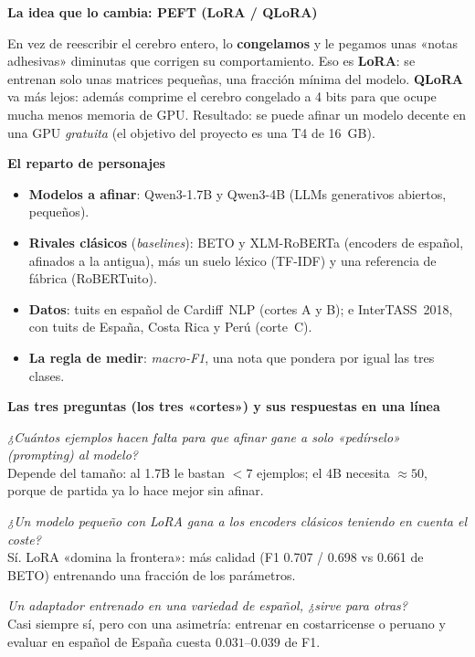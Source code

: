 \documentclass[11pt,a4paper]{article}
\newcommand{\nivel}[1]{\medskip\noindent\textbf{\textcolor{blue!45!black}{#1}}\par\nopagebreak\smallskip}
\begin{document}
\nivel{La idea que lo cambia: PEFT (LoRA / QLoRA)}
En vez de reescribir el cerebro entero, lo \textbf{congelamos} y le pegamos unas «notas adhesivas»
diminutas que corrigen su comportamiento. Eso es \textbf{LoRA}: se entrenan solo unas matrices
pequeñas, una fracción mínima del modelo. \textbf{QLoRA} va más lejos: además comprime el cerebro
congelado a 4 bits para que ocupe mucha menos memoria de GPU. Resultado: se puede afinar un modelo
decente en una GPU \emph{gratuita} (el objetivo del proyecto es una T4 de 16~GB).

\nivel{El reparto de personajes}
\begin{itemize}[nosep]
  \item \textbf{Modelos a afinar}: Qwen3-1.7B y Qwen3-4B (LLMs generativos abiertos, pequeños).
  \item \textbf{Rivales clásicos} (\emph{baselines}): BETO y XLM-RoBERTa (encoders de español,
        afinados a la antigua), más un suelo léxico (TF-IDF) y una referencia de fábrica
        (RoBERTuito).
  \item \textbf{Datos}: tuits en español de Cardiff~NLP (cortes A y B); e InterTASS~2018, con
        tuits de España, Costa Rica y Perú (corte~C).
  \item \textbf{La regla de medir}: \emph{macro-F1}, una nota que pondera por igual las tres clases.
\end{itemize}

\nivel{Las tres preguntas (los tres «cortes») y sus respuestas en una línea}
\begin{description}[leftmargin=1.6cm,style=nextline,font=\bfseries]
  \item[Cut A] \emph{¿Cuántos ejemplos hacen falta para que afinar gane a solo «pedírselo» (prompting) al modelo?}
        \\ Depende del tamaño: al 1.7B le bastan $<7$ ejemplos; el 4B necesita $\approx 50$, porque de partida ya lo hace mejor sin afinar.
  \item[Cut B] \emph{¿Un modelo pequeño con LoRA gana a los encoders clásicos teniendo en cuenta el coste?}
        \\ Sí. LoRA «domina la frontera»: más calidad (F1 0.707 / 0.698 vs 0.661 de BETO) entrenando una fracción de los parámetros.
  \item[Cut C] \emph{Un adaptador entrenado en una variedad de español, ¿sirve para otras?}
        \\ Casi siempre sí, pero con una asimetría: entrenar en costarricense o peruano y evaluar en español de España cuesta $0.031$--$0.039$ de F1.
\end{description}
\end{document}
